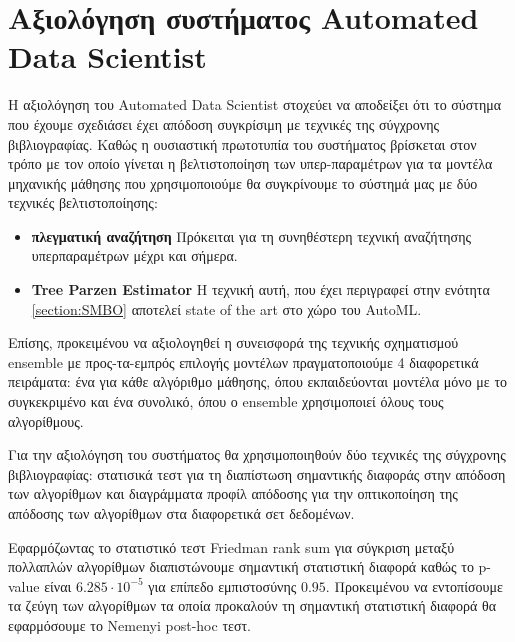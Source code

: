 \section{Αξιολόγηση συστήματος Automated Data Scientist}\label{section:eval_system}
Η αξιολόγηση του Automated Data Scientist στοχεύει να αποδείξει ότι το σύστημα που έχουμε σχεδιάσει έχει απόδοση συγκρίσιμη με τεχνικές της σύγχρονης βιβλιογραφίας. Καθώς η ουσιαστική πρωτοτυπία του συστήματος βρίσκεται στον τρόπο με τον οποίο γίνεται η βελτιστοποίηση των υπερ-παρα\-μέ\-τρων για τα μοντέλα μηχανικής μάθησης που χρησιμοποιούμε θα συγκρίνουμε το σύστημά μας με δύο τεχνικές βελτιστοποίησης:
\begin{itemize}
	\item \textbf{πλεγματική αναζήτηση} Πρόκειται για τη συνηθέστερη τεχνική αναζήτησης υπερπαρα\-μέτρων μέχρι και σήμερα.
	\item \textbf{Tree Parzen Estimator} Η τεχνική αυτή, που έχει περιγραφεί στην ενότητα \ref{section:SMBO} αποτελεί state of the art στο χώρο του AutoML.
\end{itemize}

Eπίσης, προκειμένου να αξιολογηθεί η συνεισφορά της τεχνικής σχηματισμού ensemble  με προς-τα-εμπρός επιλογής μοντέλων πραγματοποιούμε 4 διαφορετικά πειράματα: ένα για κάθε αλγόριθμο μάθησης, όπου εκπαιδεύονται μοντέλα μόνο με το συγκεκριμένο και ένα συνολικό, όπου ο ensemble χρησιμοποιεί όλους τους αλγορίθμους. 

Για την αξιολόγηση του συστήματος θα χρησιμοποιηθούν δύο τεχνικές της σύγχρονης βιβλιογραφίας: στατισικά τεστ για τη διαπίστωση σημαντικής διαφοράς στην απόδοση των αλγορίθμων και διαγράμματα προφίλ απόδοσης για την οπτικοποίηση της απόδοσης των αλγορίθμων στα διαφορετικά σετ δεδομένων. 

Εφαρμόζωντας το στατιστικό τεστ Friedman rank sum για σύγκριση μεταξύ πολλαπλών αλγορίθμων διαπιστώνουμε σημαντική στατιστική διαφορά καθώς το p-value είναι $6.285 \cdot 10^{-5}$ για επίπεδο εμπιστοσύνης $0.95$. Προκειμένου να εντοπίσουμε τα ζεύγη των αλγορίθμων τα οποία προκαλούν τη σημαντική στατιστική διαφορά θα εφαρμόσουμε το Nemenyi post-hoc τεστ.

